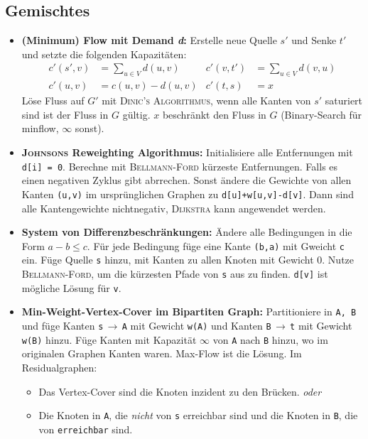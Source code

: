 \subsection{Gemischtes}
\begin{itemize}
	\item \textbf{(Minimum) Flow mit Demand \textit{d}:}
	Erstelle neue Quelle $s'$ und Senke $t'$ und setzte die folgenden Kapazitäten:
	\begin{align*}
		c'(s',v)&=\sum_{u\in{}V}d(u,v)&c'(v,t')&=\sum_{u\in{}V}d(v,u)\\[-0.5ex]
		c'(u,v)&=c(u,v)-d(u,v)&c'(t,s)&=x
	\end{align*}
	Löse Fluss auf $G'$ mit \textsc{Dinic's Algorithmus}, wenn alle Kanten von $s'$ saturiert sind ist der Fluss in $G$ gültig. $x$ beschränkt den Fluss in $G$ (Binary-Search für minflow, $\infty$ sonst).
	\item \textbf{\textsc{Johnsons} Reweighting Algorithmus:}
	Initialisiere alle Entfernungen mit \texttt{d[i] = 0}. Berechne mit \textsc{Bellmann-Ford} kürzeste Entfernungen.
	Falls es einen negativen Zyklus gibt abrrechen.
	Sonst ändere die Gewichte von allen Kanten \texttt{(u,v)} im ursprünglichen Graphen zu \texttt{d[u]+w[u,v]-d[v]}.
	Dann sind alle Kantengewichte nichtnegativ, \textsc{Dijkstra} kann angewendet werden.

	\item \textbf{System von Differenzbeschränkungen:}
	Ändere alle Bedingungen in die Form $a-b \leq c$.
	Für jede Bedingung füge eine Kante \texttt{(b,a)} mit Gweicht \texttt{c} ein.
	Füge Quelle \texttt{s} hinzu, mit Kanten zu allen Knoten mit Gewicht 0.
	Nutze \textsc{Bellmann-Ford}, um die kürzesten Pfade von \texttt{s} aus zu finden.
	\texttt{d[v]} ist mögliche Lösung für \texttt{v}.

	\item \textbf{Min-Weight-Vertex-Cover im Bipartiten Graph:}
	Partitioniere in \texttt{A, B} und füge Kanten \texttt{s}\,$\rightarrow$\,\texttt{A} mit Gewicht \texttt{w(A)} und Kanten  \texttt{B}\,$\rightarrow$\,\texttt{t} mit Gewicht \texttt{w(B)} hinzu.
	Füge Kanten mit Kapazität $\infty$ von \texttt{A} nach \texttt{B} hinzu, wo im originalen Graphen Kanten waren.
	Max-Flow ist die Lösung.\newline
	Im Residualgraphen:
	\begin{itemize}
		\item Das Vertex-Cover sind die Knoten inzident zu den Brücken. \emph{oder}
		\item Die Knoten in \texttt{A}, die \emph{nicht} von \texttt{s} erreichbar sind und die Knoten in \texttt{B}, die von \texttt{erreichbar} sind.
	\end{itemize}


\end{itemize}
